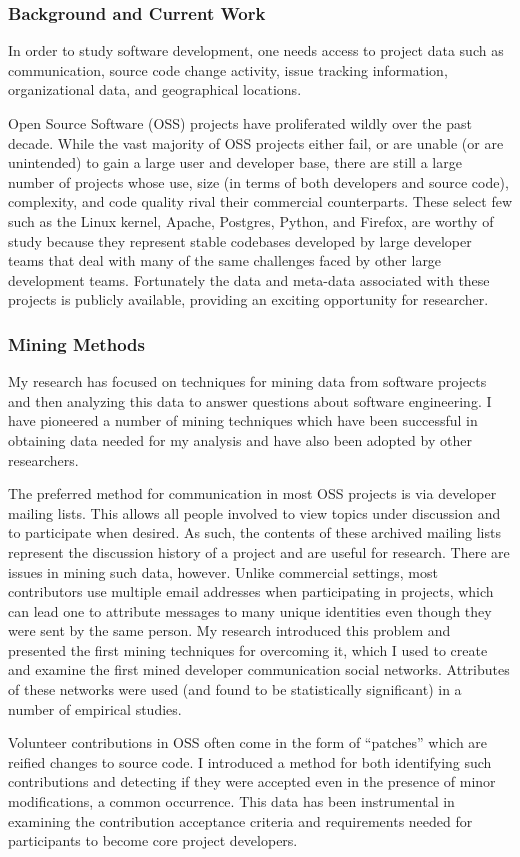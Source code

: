 \documentclass[10pt]{article}
\newcommand\Section[1]{\subsubsection*{\large #1}}
\newcommand\Subsection[1]{\subsubsection*{\small #1}}
\begin{document}
\begin{small}
\Section{Background and Current Work}

In order to study software development, one needs access to project data such
as communication, source code change activity, issue tracking information,
organizational data, and geographical locations.  

Open Source Software (OSS) projects have proliferated wildly over the past
decade.  While the vast majority of OSS projects either fail, or are unable (or
are unintended) to gain a large user and developer base, there are still a
large number of projects whose use, size (in terms of both developers and
source code), complexity, and code quality rival their commercial
counterparts.  These select few such as the Linux kernel, Apache, Postgres,
Python, and Firefox, are worthy of study because they represent stable
codebases developed by large developer teams that deal with many of the same
challenges faced by other large development teams.  Fortunately the
data and meta-data associated with these projects is publicly available,
providing an exciting opportunity for researcher.

\Subsection{Mining Methods}

My research has focused on techniques for mining data from software projects
and then analyzing this data to answer questions about software engineering.  I
have pioneered a number of mining techniques which have been successful in
obtaining data needed for my analysis and have also been adopted by other researchers.

The preferred method for communication in most OSS projects is via developer
mailing lists.  This allows all people involved to view topics under discussion
and to participate when desired.  As such, the contents of these archived
mailing lists represent the discussion history of a project and are useful for
research.
There are issues in mining such data, however.  Unlike commercial settings,
most contributors use multiple email addresses when participating in projects,
which can lead one to attribute messages to many unique identities even though
they were sent by the same person.  My research introduced this problem and
presented the first mining techniques for overcoming it, which I used to create
and examine the first mined developer communication social networks.  Attributes of these
networks were used (and found to be statistically significant) in a number of
empirical studies.

Volunteer contributions in OSS often come in the form of ``patches'' which are
reified changes to source code.  I introduced a method for both identifying
such contributions and detecting if they were accepted even in the presence of
minor modifications, a common occurrence.  This data has been instrumental in
examining the contribution acceptance criteria and 
requirements needed for participants to become core project
developers.


\end{small}
\end{document}
